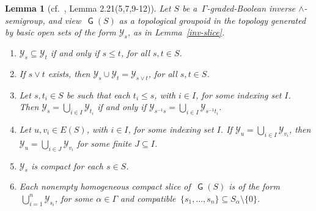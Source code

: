 \documentclass[a4paper,reqno,12pt]{amsart}
\numberwithin{equation}{section}
\theoremstyle{plain}
\newtheorem{lemma}[thm]{Lemma}
\theoremstyle{definition}
\newcommand{\GP}{\operatorname{\mathsf{G}}}
\begin{document}
\begin{lemma}[cf.\ \cite{Lawson2}, Lemma 2.21(5,7,9-12)] \label{inv-slice2}
Let $S$ be a $\, \Gamma$-graded-Boolean inverse $\land$-semigroup, and view $\, \GP(S)$ as a topological groupoid in the topology generated by basic open sets of the form $\mathcal{Y}_s$, as in Lemma~\ref{inv-slice}.
\begin{enumerate}[\upshape(1)]
\item $\mathcal{Y}_s \subseteq \mathcal{Y}_t$ if and only if $s \leq t$, for all $s,t \in S$.

\smallskip 

\item If $s\lor t$ exists, then $\mathcal{Y}_s \cup \mathcal{Y}_t = \mathcal{Y}_{s\lor t}$, for all $s,t \in S$.

\smallskip

\item Let $s, t_i \in S$ be such that each $t_i \leq s$, with $i \in I$, for some indexing set $I$. Then $\mathcal{Y}_{s} = \bigcup_{i\in I} \mathcal{Y}_{t_i}$ if and only if $\mathcal{Y}_{s^{-1}s} = \bigcup_{i\in I} \mathcal{Y}_{s^{-1}t_i}$.

\smallskip

\item Let $u, v_i \in E(S)$, with $i \in I$, for some indexing set $I$. If $\mathcal{Y}_{u} = \bigcup_{i\in I} \mathcal{Y}_{v_i}$, then $\mathcal{Y}_{u} = \bigcup_{i\in J} \mathcal{Y}_{v_i}$ for some finite $J \subseteq I$. 

\smallskip

\item $\mathcal{Y}_s$ is compact for each $s \in S$.

\smallskip 

\item Each nonempty homogeneous compact slice of $\, \GP(S)$ is of the form $\, \bigcup_{i=1}^n \mathcal{Y}_{s_i}$, for some $\alpha \in \Gamma$ and compatible $\, \{s_1, \dots, s_n\} \subseteq S_{\alpha} \setminus \{0\}$.
\end{enumerate}
\end{lemma}
\end{document}
